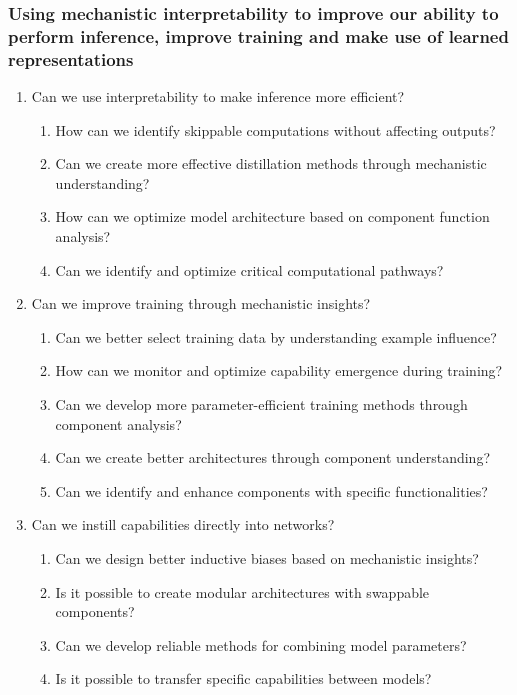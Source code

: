 \subsubsection{Using mechanistic interpretability to improve our ability to perform inference, improve training and make use of learned representations}
\begin{enumerate}
    \item Can we use interpretability to make inference more efficient?
    \begin{enumerate}[label=\alph*.]
        \item How can we identify skippable computations without affecting outputs?
        \item Can we create more effective distillation methods through mechanistic understanding?
        \item How can we optimize model architecture based on component function analysis?
        \item Can we identify and optimize critical computational pathways?
    \end{enumerate}
    
    \item Can we improve training through mechanistic insights?
    \begin{enumerate}[label=\alph*.]
        \item Can we better select training data by understanding example influence?
        \item How can we monitor and optimize capability emergence during training?
        \item Can we develop more parameter-efficient training methods through component analysis?
        \item Can we create better architectures through component understanding?
        \item Can we identify and enhance components with specific functionalities?
    \end{enumerate}
    
    \item Can we instill capabilities directly into networks?
    \begin{enumerate}[label=\alph*.]
        \item Can we design better inductive biases based on mechanistic insights?
        \item Is it possible to create modular architectures with swappable components?
        \item Can we develop reliable methods for combining model parameters?
        \item Is it possible to transfer specific capabilities between models?
    \end{enumerate}
\end{enumerate}

